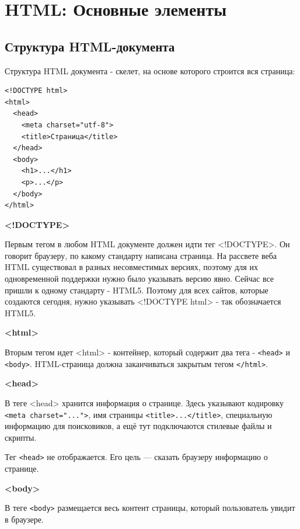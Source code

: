 \documentclass[14pt]{extreport}
\begin{document}
\chapter{HTML: Основные элементы}

\section{Структура HTML-документа}

Структура HTML документа - скелет, на основе которого строится вся страница:
\begin{verbatim}
<!DOCTYPE html>
<html>
  <head>
    <meta charset="utf-8">
    <title>Страница</title>
  </head>
  <body>
    <h1>...</h1>
    <p>...</p>
  </body>
</html>
\end{verbatim}

\textbf{<!DOCTYPE>}

Первым тегом в любом HTML документе должен идти тег <!DOCTYPE>. Он говорит браузеру, по какому стандарту написана страница. На рассвете веба HTML существовал в разных несовместимых версиях, поэтому для их одновременной поддержки нужно было указывать версию явно. Сейчас все пришли к одному стандарту - HTML5. Поэтому для всех сайтов, которые создаются сегодня, нужно указывать <!DOCTYPE html> - так обозначается HTML5.

\textbf{<html>}

Вторым тегом идет <html> - контейнер, который содержит два тега - \texttt{<head>} и \texttt{<body>}. HTML-страница должна заканчиваться закрытым тегом \texttt{</html>}.

\textbf{<head>}

В теге <head> хранится информация о странице. Здесь указывают кодировку \texttt{<meta charset="...">}, имя страницы \texttt{<title>...</title>}, специальную информацию для поисковиков, а ещё тут подключаются стилевые файлы и скрипты.

Тег \texttt{<head>} не отображается. Его цель — сказать браузеру информацию о странице.

\textbf{<body>}

В теге \texttt{<body>} размещается весь контент страницы, который пользователь увидит в браузере.
\end{document}

